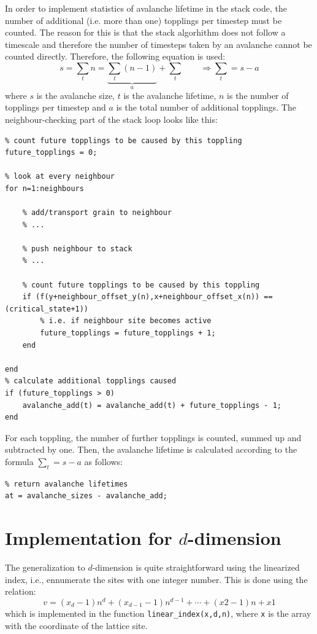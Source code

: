 In order to implement statistics of avalanche lifetime in the stack code, the number of additional (i.e. more than one) topplings per timestep must be counted. The reason for this is that the stack algorhithm does not follow a timescale and therefore the number of timesteps taken by an avalanche cannot be counted directly. Therefore, the following equation is used:
\[
s = \sum _t n = \underbrace{\sum_t (n - 1)}_{a} + \sum _t
\qquad \Rightarrow \sum _t = s - a
\]
where $s$ is the avalanche size, $t$ is the avalanche lifetime, $n$ is the number of topplings per timestep and $a$ is the total number of additional topplings. The neighbour-checking part of the stack loop looks like this:
\begin{lstlisting}
% count future topplings to be caused by this toppling
future_topplings = 0;

% look at every neighbour
for n=1:neighbours

	% add/transport grain to neighbour
	% ...

	% push neighbour to stack
	% ...

	% count future topplings to be caused by this toppling
	if (f(y+neighbour_offset_y(n),x+neighbour_offset_x(n)) == (critical_state+1))
		% i.e. if neighbour site becomes active
		future_topplings = future_topplings + 1;
	end

end
% calculate additional topplings caused
if (future_topplings > 0)
	avalanche_add(t) = avalanche_add(t) + future_topplings - 1;
end
\end{lstlisting}
For each toppling, the number of further topplings is counted, summed up and subtracted by one. Then, the avalanche lifetime is calculated according to the formula $\sum _t = s - a$ as follows:
\begin{lstlisting}
% return avalanche lifetimes
at = avalanche_sizes - avalanche_add;
\end{lstlisting}

\section{Implementation for $d$-dimension}

The generalization to $d$-dimension is quite straightforward using the linearized index, i.e., ennumerate the sites with one integer number. 
This is done using the relation:
\[
 v=(x_d-1)n^d+(x_{d-1}-1)n^{d-1}+\cdots+(x2-1)n+x1
\]
which is implemented in the function \texttt{linear_index(x,d,n)}, where \texttt{x} is the array with the coordinate of the lattice site. 



